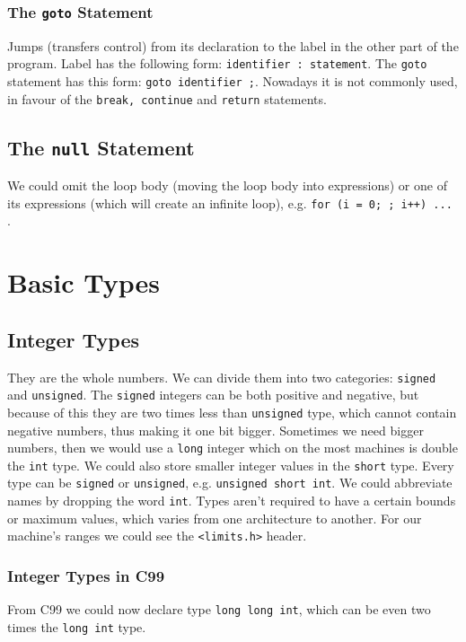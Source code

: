 \documentclass[12pt, openany]{book}
\begin{document}
    \subsection*{The \texttt{goto} Statement}
    Jumps (transfers control) from its declaration to the label in the other part
    of the program. Label has the following form: \texttt{identifier : statement}.
    The \texttt{goto} statement has this form: \texttt{goto identifier ;}. Nowadays
    it is not commonly used, in favour of the \texttt{break, continue} and
    \texttt{return} statements.

    \section{The \texttt{null} Statement}
    We could omit the loop body (moving the loop body into expressions) or one of
    its expressions (which will create an infinite loop), e.g.
    \texttt{for (i = 0; ; i++) {...} }.

    \chapter{Basic Types}

    \section{Integer Types}
    They are the whole numbers. We can divide them into two categories: \texttt{signed}
    and \texttt{unsigned}. The \texttt{signed} integers can be both positive and
    negative, but because of this they are two times less than \texttt{unsigned} type,
    which cannot contain negative numbers, thus making it one bit bigger. Sometimes we
    need bigger numbers, then we would use a \texttt{long} integer which on the most
    machines is double the \texttt{int} type. We could also store smaller integer values
    in the \texttt{short} type. Every type can be \texttt{signed} or \texttt{unsigned},
    e.g. \texttt{unsigned short int}. We could abbreviate names by dropping the word
    \texttt{int}. Types aren't required to have a certain bounds or maximum values, which
    varies from one architecture to another. For our machine's ranges we could see the
    \texttt{<limits.h>} header.

    \subsection*{Integer Types in C99}
    From C99 we could now declare type \texttt{long long int}, which can be even two
    times the \texttt{long int} type.
\end{document}
